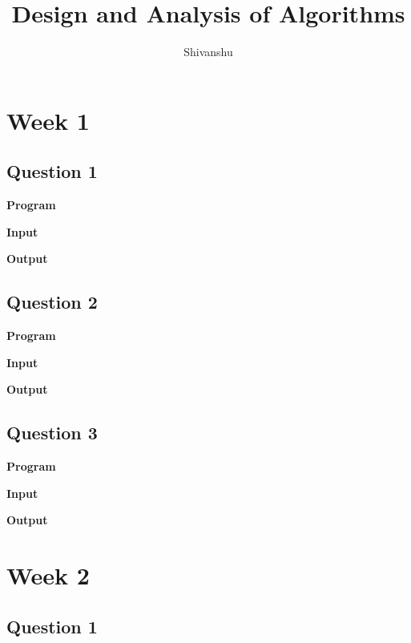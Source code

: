 \documentclass{article}
\title{Design and Analysis of Algorithms}
\author{Shivanshu}
\begin{document}
\maketitle
\newpage

\tableofcontents
\newpage

\section{Week 1}

\subsection{Question 1}

\newline

\noindent \textbf{\large{Program}}

\newpage
\noindent \textbf{\large{Input}}

\noindent \textbf{\large{Output}}


\newpage
\subsection{Question 2}

\newline

\noindent \textbf{\large{Program}}

\newpage
\noindent \textbf{\large{Input}}

\noindent \textbf{\large{Output}}


\newpage
\subsection{Question 3}

\newline

\noindent \textbf{\large{Program}}

\newpage
\noindent \textbf{\large{Input}}

\noindent \textbf{\large{Output}}


\newpage
\section{Week 2}

\subsection{Question 1}

\newline
\end{document}
